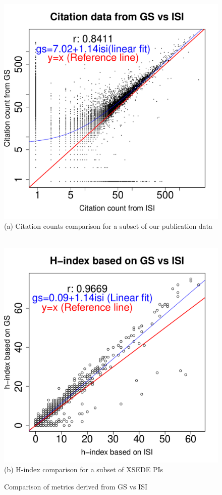 \documentclass{sig-alternate}
\begin{document}
\begin{figure}[!htb] 
\begin{minipage}[t]{0.22\textwidth}
  \centering 
    \includegraphics[width=1.0\columnwidth]{images/11_gs_vs_isi_cites_bigfont.pdf} 
    (a) Citation counts comparison for a subset of our publication data
\ \
\end{minipage}
\begin{minipage}[t]{0.22\textwidth}
  \centering 
    \includegraphics[width=1.0\columnwidth]{images/11_gs_vs_isi_hindex_bigfont.pdf} 
    (b) H-index comparison for a subset of XSEDE PIs
\end{minipage}

\caption{Comparison of metrics derived from GS vs ISI}\label{F:gs-vs-isi}
\end{figure}
\end{document}
